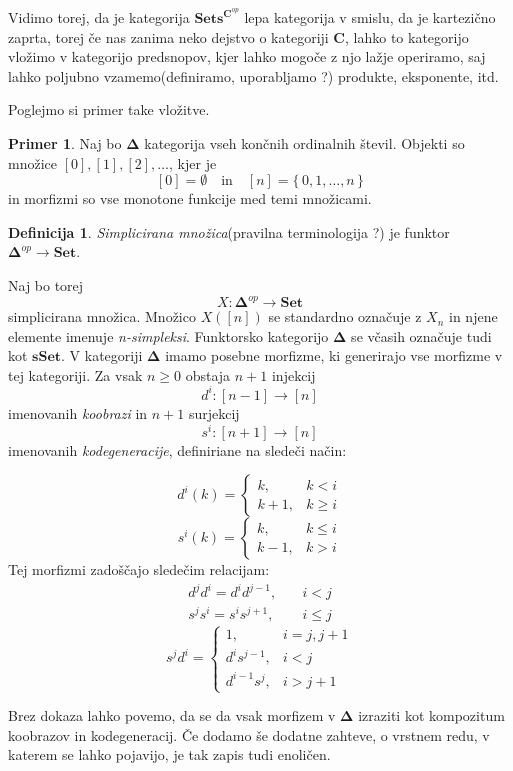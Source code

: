 \documentclass[12pt,a4paper]{book}
\theoremstyle{definition}
\newtheorem{definicija}{Definicija}[chapter]
\theoremstyle{plain}
\theoremstyle{definition}
\newtheorem{primer}{Primer}[section]
\theoremstyle{remark}
\newcommand{\cat}[1]{\textbf{#1}}
\renewcommand{\set}[1]{\{\,#1\,\}}
\newcommand{\predsnop}[1]{\cat{Sets}^{\cat{#1}^{op}}}
\begin{document}
Vidimo torej, da je kategorija $\predsnop{C}$ lepa kategorija v smislu, da je kartezično zaprta, torej če nas zanima neko dejstvo o kategoriji $\cat{C}$, lahko to kategorijo vložimo v kategorijo predsnopov, kjer lahko mogoče z njo lažje operiramo, saj lahko poljubno vzamemo(definiramo, uporabljamo ?) produkte, eksponente, itd.


Poglejmo si primer take vložitve.

\begin{primer}
Naj bo $\mathbf{\Delta}$ kategorija vseh končnih ordinalnih števil. Objekti so množice $[0],[1],[2],\ldots$, kjer je 
$$[0] = \emptyset \quad \text{in} \quad [n] = \set{0,1,\ldots,n}$$
in morfizmi so vse monotone funkcije med temi množicami.

\begin{definicija}
\emph{Simplicirana množica}(pravilna terminologija ?) je funktor $\mathbf{\Delta}^{op} \to \cat{Set}$.
\end{definicija}
Naj bo torej
$$X : \mathbf{\Delta}^{op} \to \cat{Set}$$
simplicirana množica. Množico $X([n])$ se standardno označuje z $X_n$ in njene elemente imenuje \emph{n-simpleksi}. Funktorsko kategorijo $\mathbf{\Delta}$ se včasih označuje tudi kot $\cat{sSet}$.
V kategoriji $\mathbf{\Delta}$ imamo posebne morfizme, ki generirajo vse morfizme v tej kategoriji. Za vsak $n \geq 0$ obstaja $n+1$ injekcij 
$$d^i : [n-1] \to [n]$$ 
imenovanih \emph{koobrazi} in $n+1$ surjekcij 
$$s^i : [n+1] \to [n]$$
imenovanih \emph{kodegeneracije}, definiriane na sledeči način:

$$d^i(k) = \begin{cases}
k, & k < i \\
k+1, & k \geq i 
\end{cases} $$
$$s^i(k) = \begin{cases}
k, & k \leq i \\
k-1, & k > i
\end{cases} $$
Tej morfizmi zadoščajo sledečim relacijam:
\begin{align*}
d^j d^i = d^i d^{j-1}, & \quad i < j \\
s^j s^i = s^i s^{j+1}, & \quad i \leq j 
\end{align*}
$$ s^j d^i = \begin{cases}
1, & i = j, j+1 \\
d^i s^{j-1}, & i < j \\
d^{i-1} s^j, & i > j+1
\end{cases} $$

Brez dokaza lahko povemo, da se da vsak morfizem v $\mathbf{\Delta}$ izraziti kot kompozitum koobrazov in kodegeneracij. Če dodamo še dodatne zahteve, o vrstnem redu, v katerem se lahko pojavijo, je tak zapis tudi enoličen.



\end{primer}
\end{document}
